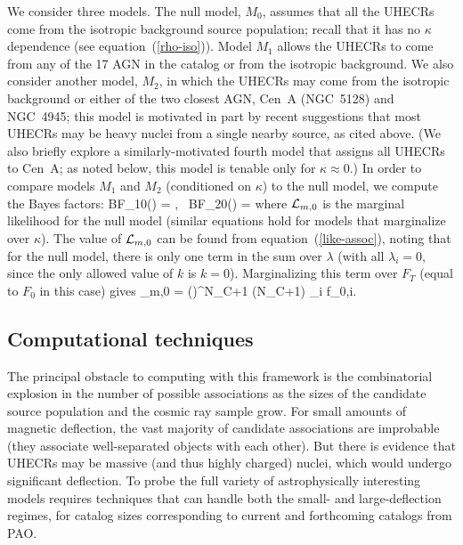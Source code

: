 We consider three models.  The null model, $M_0$, assumes that all the
UHECRs come from the isotropic background source population; recall that it
has no $\kappa$ dependence (see equation~(\ref{rho-iso})).  Model $M_1$
allows the UHECRs to come from any of the 17 AGN in the catalog or from the
isotropic background.  We also consider another model, $M_2$, in which the
UHECRs may come from the isotropic background or either of the two closest
AGN, Cen~A (NGC~5128) and NGC~4945; this model is motivated in part by
recent suggestions that most UHECRs may be heavy nuclei from a single nearby
source, as cited above.  
(We also briefly explore a similarly-motivated fourth model that assigns all
UHECRs to Cen~A; as noted below, this model is tenable only for
$\kappa\approx 0$.)  In order to compare models $M_1$ and $M_2$ (conditioned
on $\kappa$) to the null model, we compute the Bayes factors:
\be
\mbox{BF}_{10}(\kappa) = ,
\qquad
\mbox{ BF}_{20}(\kappa) = 
\label{BF10+20}
\ee
where ${\cal L}_{m,0}$ is the marginal likelihood for the null
model (similar equations hold for models
that marginalize over $\kappa$).  The value of ${\cal L}_{m,0}$
can be found from equation~(\ref{like-assoc}), noting that for the
null model, there is only one term in the sum over $\lambda$
(with all $\lambda_i = 0$, since the only allowed value of $k$ is $k=0$).
Marginalizing this term over $F_T$ (equal to $F_0$ in this case) gives
\be
\like_{m,0} =
  \left(\right)^{N_C+1}
  \Gamma(N_C+1) \times \prod_i f_{0,i}.
\ee

\subsection{Computational techniques}
\label{subsec:compn}

The principal obstacle to computing with this framework is the combinatorial
explosion in the number of possible associations as the sizes of the
candidate source population and the cosmic ray sample grow.  For small
amounts of magnetic deflection, the vast majority of candidate associations
are improbable (they associate well-separated objects with each other). But
there is evidence that UHECRs may be massive (and thus highly charged)
nuclei, which would undergo significant deflection. To probe the full
variety of astrophysically interesting models requires techniques that can
handle both the small- and large-deflection regimes, for catalog sizes
corresponding to current and forthcoming catalogs from PAO.

